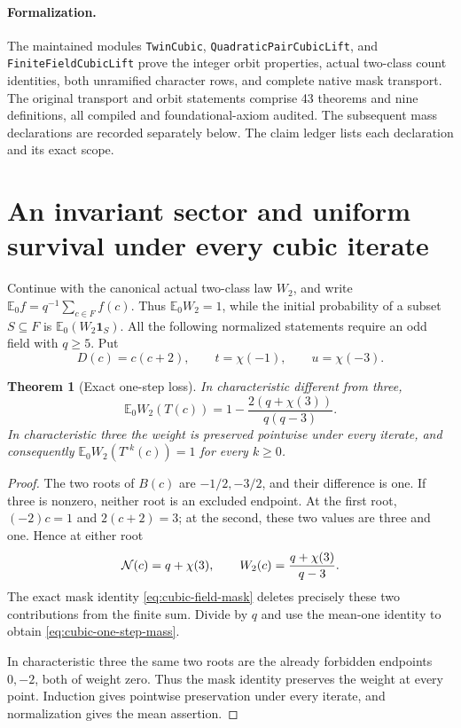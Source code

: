 \documentclass[11pt]{article}
\newtheorem{theorem}{Theorem}[section]
\begin{document}
\paragraph{Formalization.}
The maintained modules \texttt{TwinCubic},
\texttt{QuadraticPairCubicLift}, and \texttt{FiniteFieldCubicLift}
prove the integer orbit properties, actual two-class count identities,
both unramified character rows, and complete native mask transport.
The original transport and orbit statements comprise 43 theorems and
nine definitions, all compiled and foundational-axiom audited.
The subsequent mass declarations are recorded separately below.
The claim ledger lists each declaration and its exact scope.

\section{An invariant sector and uniform survival under every cubic iterate}
\label{sec:cubic-mass-survival}

Continue with the canonical actual two-class law \(W_2\), and write
\(\mathbb E_0 f=q^{-1}\sum_{c\in F}f(c)\).
Thus \(\mathbb E_0W_2=1\), while the initial probability of a subset
\(S\subseteq F\) is \(\mathbb E_0(W_2\mathbf1_S)\).
All the following normalized statements require an odd field with
\(q\ge5\). Put
\[
 D(c)=c(c+2),\qquad t=\chi(-1),\qquad u=\chi(-3).
\]

\begin{theorem}[Exact one-step loss]
\label{thm:cubic-one-step-mass}
In characteristic different from three,
\[
 \mathbb E_0 W_2(T(c))
 =1-\frac{2(q+\chi(3))}{q(q-3)}.
 \tag{C7}\label{eq:cubic-one-step-mass}
\]
In characteristic three the weight is preserved pointwise under every
iterate, and consequently
\(\mathbb E_0 W_2(T^{\circ k}(c))=1\) for every \(k\ge0\).
\end{theorem}
\begin{proof}
The two roots of \(B(c)\) are \(-1/2,-3/2\), and their difference is one.
If three is nonzero, neither root is an excluded endpoint.
At the first root,
\((-2)c=1\) and \(2(c+2)=3\); at the second, these two values are
three and one. Hence at either root
\[
 {\cal N}(c)=q+\chi(3),\qquad
 W_2(c)=\frac{q+\chi(3)}{q-3}.
\]
The exact mask identity \eqref{eq:cubic-field-mask} deletes precisely
these two contributions from the finite sum. Divide by \(q\) and use
the mean-one identity to obtain \eqref{eq:cubic-one-step-mass}.

In characteristic three the same two roots are the already forbidden
endpoints \(0,-2\), both of weight zero. Thus the mask identity preserves
the weight at every point. Induction gives pointwise preservation under
every iterate, and normalization gives the mean assertion.
\end{proof}
\end{document}
